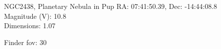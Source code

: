 \begin{block}{NGC2438, Planetary Nebula in Pup}
    RA: 07:41:50.39, Dec: -14:44:08.8 \\ 
    Magnitude (V): 10.8 \\ 
    Dimensions: 1.07 

    Finder fov: 30 
\end{block}